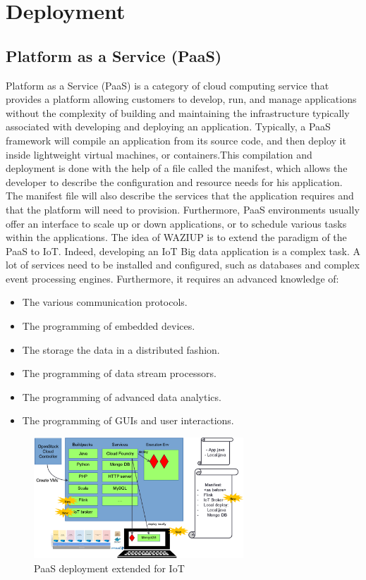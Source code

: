 

\section{Deployment}
\label{sec:deploy}

\subsection{Platform as a Service (PaaS)}


Platform as a Service (PaaS) is a category of cloud computing service that provides a platform allowing customers to develop, run, and manage applications without the complexity of building and maintaining the infrastructure typically associated with developing and deploying an application.
Typically, a PaaS framework will compile an application from its source code, and then deploy it inside lightweight virtual machines, or containers.This compilation and deployment is done with the help of a file called the manifest, which allows the developer to describe the configuration and resource needs for his application.
The manifest file will also describe the services that the application requires and that the platform will need to provision.
Furthermore, PaaS environments usually offer an interface to scale up or down applications, or to schedule various tasks within the applications.
The idea of WAZIUP is to extend the paradigm of the PaaS to IoT.
Indeed, developing an IoT Big data application is a complex task.
A lot of services need to be installed and configured, such as databases and complex event processing engines.
Furthermore, it requires an advanced knowledge of:
\begin{itemize}
  \item The various communication protocols.
  \item The programming of embedded devices.
  \item The storage the data in a distributed fashion.
  \item The programming of data stream processors.
  \item The programming of advanced data analytics.
  \item The programming of GUIs and user interactions.
\end{itemize}

\begin{figure}[h!]
\centering
\includegraphics[width=0.7\textwidth]{figs/paas.png}
\caption{PaaS deployment extended for IoT}
\label{fig:paas}
\end{figure}

